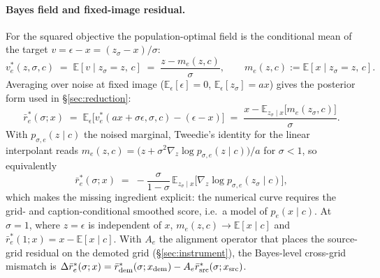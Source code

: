 \paragraph{Bayes field and fixed-image residual.}
For the squared objective the population-optimal field is the
conditional mean of the target
$v = \epsilon - x = (z_\sigma - x)/\sigma$:
\begin{equation}
v_e^{*}(z, \sigma, c)
\;=\; \mathbb{E}[v \mid z_\sigma = z,\, c]
\;=\; \frac{z - m_e(z, c)}{\sigma},
\qquad
m_e(z, c) := \mathbb{E}[x \mid z_\sigma = z,\, c].
\label{eq:appbayesfield}
\end{equation}
Averaging over noise at fixed image
($\mathbb{E}_\epsilon[\epsilon] = 0$,
$\mathbb{E}_\epsilon[z_\sigma] = a x$) gives the posterior form
used in \S\ref{sec:reduction}:
\begin{equation}
\bar r_e^{*}(\sigma; x)
\;=\; \mathbb{E}_\epsilon\big[v_e^{*}(a x + \sigma \epsilon, \sigma, c)
      - (\epsilon - x)\big]
\;=\; \frac{x - \mathbb{E}_{z_\sigma \mid x}\big[m_e(z_\sigma,
      c)\big]}{\sigma}.
\label{eq:appposterior}
\end{equation}
With $p_{\sigma,e}(z \mid c)$ the noised marginal, Tweedie's identity
for the linear interpolant reads
$m_e(z, c) = \big(z + \sigma^2 \nabla_z \log p_{\sigma,e}(z \mid
c)\big)/a$ for $\sigma < 1$, so equivalently
\begin{equation}
\bar r_e^{*}(\sigma; x)
\;=\; -\frac{\sigma}{1 - \sigma}\,
\mathbb{E}_{z_\sigma \mid x}\big[\nabla_z \log
p_{\sigma,e}(z_\sigma \mid c)\big],
\label{eq:appscore}
\end{equation}
which makes the missing ingredient explicit: the numerical curve
requires the grid- and caption-conditional smoothed score, i.e.\ a
model of $p_e(x \mid c)$. At $\sigma = 1$, where $z = \epsilon$ is
independent of $x$, $m_e(z, c) \to \mathbb{E}[x \mid c]$ and
$\bar r_e^{*}(1; x) = x - \mathbb{E}[x \mid c]$. With $A_e$ the
alignment operator that places the source-grid residual on the demoted
grid (\S\ref{sec:instrument}), the Bayes-level cross-grid mismatch is
$\Delta \bar r_e^{*}(\sigma; x) = \bar
r_{\mathrm{dem}}^{*}(\sigma; x_{\mathrm{dem}}) - A_e \bar r_{\mathrm{src}}^{*}(\sigma;
x_{\mathrm{src}})$.

